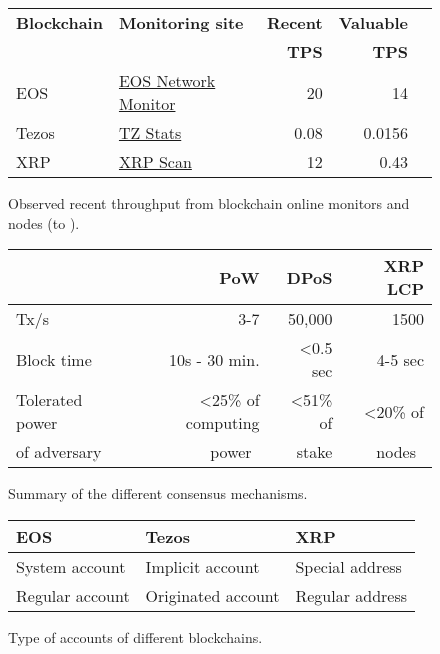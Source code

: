 

\begin{figure}[tb]
	\setlength{\tabcolsep}{1.3pt}
	\centering
	\begin{tabular}{llrrr}
		\toprule
		\bf Blockchain & \bf Monitoring site                                       & \bf Recent & \bf Valuable \\
		               &                                                           & \bf TPS    & \bf TPS      \\
		\midrule
		EOS            & \href{https://eosnetworkmonitor.io/}{EOS Network Monitor} & 20         & 14           \\
		Tezos          & \href{https://tzstats.com/}{TZ Stats}                     & 0.08       & 0.0156       \\
		XRP            & \href{https://xrpscan.com/metrics}{XRP Scan}              & 12         & 0.43         \\
		\bottomrule
	\end{tabular}
	\caption{Observed recent throughput from blockchain online  monitors and nodes (\startdate to \finishdate).}
	\label{fig:observed-tps}
\end{figure}




\begin{figure}[bt]
	\footnotesize
	\centering
	\setlength{\tabcolsep}{4pt}
	\begin{tabular}{l r r r}
		\toprule
		                & \textbf{PoW}                    & \textbf{DPoS}     & \textbf{XRP LCP}       \\
		\midrule
		Tx/s            & 3-7                             & 50,000            & 1500                   \\
		Block time      & 10s - 30 min.                   & \textless 0.5 sec & 4-5 sec                \\
		Tolerated power & \textless 25\% of computing     & \textless 51\% of & \textless 20\% of      \\
		of adversary    & power~\cite{pow_selfish_mining} & stake             & nodes~\cite{Chase2018} \\
		\bottomrule
	\end{tabular}
	\caption{Summary of the different consensus mechanisms.}
	\label{tab:consensus-mechanisms}
\end{figure}






\begin{figure}[tb]
	\centering
	\begin{tabular}{lll}
		\toprule
		\bf EOS         & \bf Tezos          & \bf XRP         \\
		\midrule
		System account  & Implicit account   & Special address \\
		Regular account & Originated account & Regular address \\
		\bottomrule
	\end{tabular}
	\caption{Type of accounts of different blockchains.}
	\label{tab:account-types}
\end{figure}


